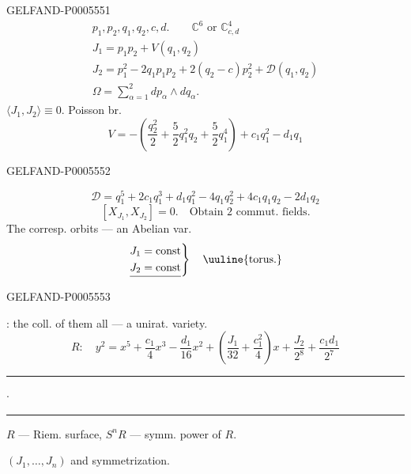 \begin{GelfandAdjacentEvidence}{GELFAND-P000555}{1}
\begin{gather*}
p_1,p_2,q_1,q_2,c,d.\qquad \mathbb C^6\text{ or }\mathbb C^4_{c,d}\\
J_1=p_1p_2+V(q_1,q_2)\\
J_2=p_1^2-2q_1p_1p_2+2(q_2-c)p_2^2+\mathcal D(q_1,q_2)\\
\Omega=\sum_{\alpha=1}^{2}dp_\alpha\wedge dq_\alpha.
\end{gather*}
\(\langle J_1,J_2\rangle\equiv0.\) \quad Poisson br.
\[
V=-\left(\frac{q_2^2}{2}+\frac52q_1^2q_2+\frac52q_1^4\right)+c_1q_1^2-d_1q_1
\]
\end{GelfandAdjacentEvidence}
\begin{GelfandAdjacentEvidence}{GELFAND-P000555}{2}

\[
\mathcal D=q_1^5+2c_1q_1^3+d_1q_1^2-4q_1q_2^2+4c_1q_1q_2-2d_1q_2
\]
\[
[X_{J_1},X_{J_2}]=0.\quad\text{Obtain 2 commut. fields.}
\]
The corresp. orbits — an Abelian var.
\[
\left.\underline{\begin{aligned}
J_1&=\mathrm{const}\\
J_2&=\mathrm{const}
\end{aligned}}\right\}\quad\text{\uuline{torus.}}
\]
\end{GelfandAdjacentEvidence}
\begin{GelfandAdjacentEvidence}{GELFAND-P000555}{3}

: the coll. of them all — a unirat. variety.
\[
R:\quad y^2=x^5+\frac{c_1}{4}x^3-\frac{d_1}{16}x^2+
\left(\frac{J_1}{32}+\frac{c_1^2}{4}\right)x+\frac{J_2}{2^8}+\frac{c_1d_1}{2^7}
\]
\hfill\rule{1.4cm}{.35pt}\enspace\(\cdot\)\enspace\rule{1.4cm}{.35pt}\par
\(R\) — Riem. surface, \quad \(S^nR\) — symm. power of \(R\).

\((J_1,\ldots,J_n)\) and symmetrization.
\end{GelfandAdjacentEvidence}
